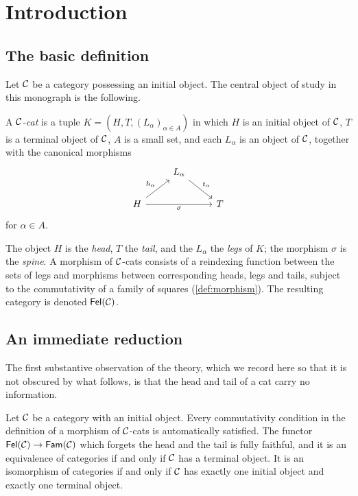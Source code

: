 \chapter{Introduction}\label{ch:intro}

\section{The basic definition}

Let $\mathcal{C}$ be a category possessing an initial object. The central object of
study in this monograph is the following.

\begin{definition*}
A \emph{$\mathcal{C}$-cat} is a tuple $K=(H,T,(L_\alpha)_{\alpha\in A})$ in which $H$
is an initial object of $\mathcal{C}$, $T$ is a terminal object of $\mathcal{C}$, $A$ is a
small set, and each $L_\alpha$ is an object of $\mathcal{C}$, together with the
canonical morphisms
\[
\begin{tikzcd}
  & L_\alpha \arrow[dr, "t_\alpha"] & \\
  H \arrow[ur, "h_\alpha"] \arrow[rr, "\sigma"'] & & T
\end{tikzcd}
\]
for $\alpha\in A$.
\end{definition*}

The object $H$ is the \emph{head}, $T$ the \emph{tail}, and the $L_\alpha$
the \emph{legs} of $K$; the morphism $\sigma$ is the \emph{spine}. A morphism
of $\mathcal{C}$-cats consists of a reindexing function between the sets of legs and
morphisms between corresponding heads, legs and tails, subject to the
commutativity of a family of squares (\cref{def:morphism}). The resulting
category is denoted $\mathsf{Fel}(\mathcal{C})$.

\section{An immediate reduction}

The first substantive observation of the theory, which we record here so that
it is not obscured by what follows, is that the head and tail of a cat carry no
information.

\begin{maintheorem}
Let $\mathcal{C}$ be a category with an initial object. Every commutativity condition
in the definition of a morphism of $\mathcal{C}$-cats is automatically satisfied. The
functor $\mathsf{Fel}(\mathcal{C})\to\mathsf{Fam}(\mathcal{C})$ which forgets the head and the tail is fully
faithful, and it is an equivalence of categories if and only if $\mathcal{C}$ has a
terminal object. It is an isomorphism of categories if and only if $\mathcal{C}$ has
exactly one initial object and exactly one terminal object.
\end{maintheorem}

